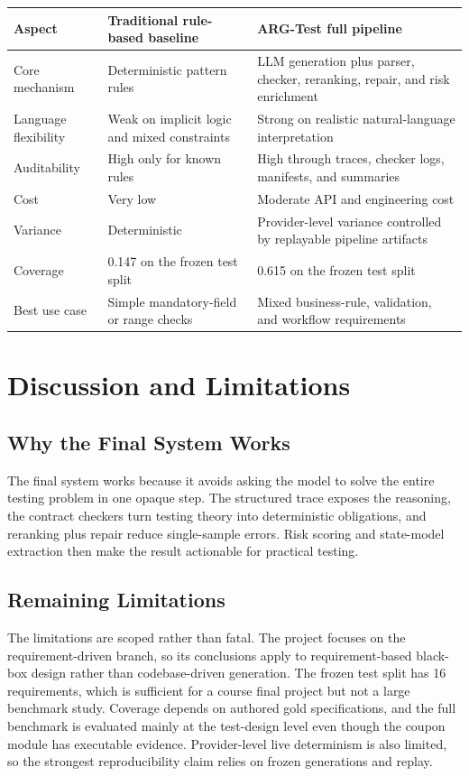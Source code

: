 \documentclass{article}
\renewcommand{\arraystretch}{1.08}
\begin{document}
\begin{center}
\captionsetup{type=table}
\label{tab:nonai}
\centering
\scriptsize
\setlength{\tabcolsep}{2.5pt}
\renewcommand{\arraystretch}{0.98}
\begin{tabular}{p{} p{} p{}}
\toprule
\textbf{Aspect} & \textbf{Traditional rule-based baseline} & \textbf{ARG-Test full pipeline} \\
\midrule
Core mechanism & Deterministic pattern rules & LLM generation plus parser, checker, reranking, repair, and risk enrichment \\
Language flexibility & Weak on implicit logic and mixed constraints & Strong on realistic natural-language interpretation \\
Auditability & High only for known rules & High through traces, checker logs, manifests, and summaries \\
Cost & Very low & Moderate API and engineering cost \\
Variance & Deterministic & Provider-level variance controlled by replayable pipeline artifacts \\
Coverage & 0.147 on the frozen test split & 0.615 on the frozen test split \\
Best use case & Simple mandatory-field or range checks & Mixed business-rule, validation, and workflow requirements \\
\bottomrule
\end{tabular}
\end{center}
\FloatBarrier

\section{Discussion and Limitations}
\subsection{Why the Final System Works}
The final system works because it avoids asking the model to solve the entire testing problem in one opaque step. The structured trace exposes the reasoning, the contract checkers turn testing theory into deterministic obligations, and reranking plus repair reduce single-sample errors. Risk scoring and state-model extraction then make the result actionable for practical testing.

\subsection{Remaining Limitations}
The limitations are scoped rather than fatal. The project focuses on the requirement-driven branch, so its conclusions apply to requirement-based black-box design rather than codebase-driven generation. The frozen test split has 16 requirements, which is sufficient for a course final project but not a large benchmark study. Coverage depends on authored gold specifications, and the full benchmark is evaluated mainly at the test-design level even though the coupon module has executable evidence. Provider-level live determinism is also limited, so the strongest reproducibility claim relies on frozen generations and replay.
\end{document}
